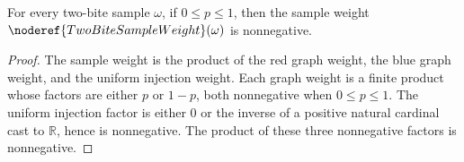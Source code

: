 \begin{helper}
For every two-bite sample \(\omega\), if \(0\le p\le 1\), then the sample
weight \(\noderef{TwoBiteSampleWeight}(\omega)\) is nonnegative.
\end{helper}
\begin{proof}
The sample weight is the product of the red graph weight, the blue graph
weight, and the uniform injection weight.  Each graph weight is a finite
product whose factors are either \(p\) or \(1-p\), both nonnegative when
\(0\le p\le1\).  The uniform injection factor is either \(0\) or the inverse
of a positive natural cardinal cast to \(\mathbb R\), hence is nonnegative.
The product of these three nonnegative factors is nonnegative.
\end{proof}
